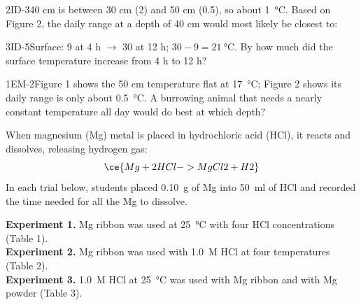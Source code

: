 \documentclass[11pt]{article}
\begin{document}
\begin{q}{2}{ID-3}{40 cm is between 30 cm (2) and 50 cm (0.5), so about \SI{1}{\celsius}.}
Based on Figure 2, the daily range at a depth of 40 cm would most likely be closest to:
\end{q}

\begin{q}{3}{ID-5}{Surface: 9 at 4 h $\to$ 30 at 12 h; $30-9 = \SI{21}{\celsius}$.}
By how much did the surface temperature increase from 4 h to 12 h?
\end{q}

\begin{q}{1}{EM-2}{Figure 1 shows the 50 cm temperature flat at \SI{17}{\celsius}; Figure 2 shows its daily range is only about \SI{0.5}{\celsius}.}
A burrowing animal that needs a nearly constant temperature all day would do best at which depth?
\end{q}

When magnesium (Mg) metal is placed in hydrochloric acid (HCl), it reacts and dissolves, releasing hydrogen gas:
\[\ce{Mg + 2HCl -> MgCl2 + H2}\]
In each trial below, students placed \SI{0.10}{\gram} of Mg into \SI{50}{\milli\litre} of HCl and recorded the time needed for all the Mg to dissolve.

\textbf{Experiment 1.} Mg ribbon was used at \SI{25}{\celsius} with four HCl concentrations (Table 1).\\
\textbf{Experiment 2.} Mg ribbon was used with \SI{1.0}{M} HCl at four temperatures (Table 2).\\
\textbf{Experiment 3.} \SI{1.0}{M} HCl at \SI{25}{\celsius} was used with Mg ribbon and with Mg powder (Table 3).
\end{document}
